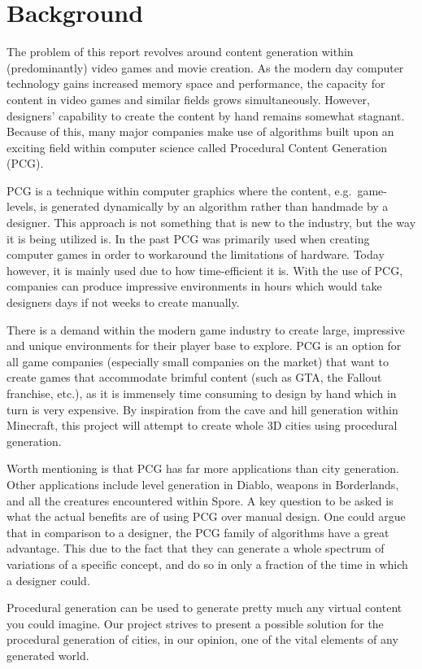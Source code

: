 \section{Background}
The problem of this report revolves around content generation within (predominantly) video games and movie creation. 
As the modern day computer technology gains increased memory space and performance, the capacity for content in video games and similar fields grows simultaneously. 
However, designers' capability to create the content by hand remains somewhat stagnant.
Because of this, many major companies make use of algorithms built upon an exciting field within computer science called Procedural Content Generation (PCG). 

PCG is a technique within computer graphics where the content, e.g.\ game-levels, is generated dynamically by an algorithm rather than handmade by a designer.
This approach is not something that is new to the industry, but the way it is being utilized is.
In the past PCG was primarily used when creating computer games  in order to workaround the limitations of hardware.
Today however, it is mainly used due to how time-efficient it is. 
With the use of PCG, companies can produce impressive environments in hours which would take designers days if not weeks to create manually.

There is a demand within the modern game industry to create large, impressive and unique environments for their player base to explore. 
PCG is an option for all game companies (especially small companies on the market) that want to create games that accommodate brimful content (such as GTA, the Fallout franchise, etc.), as it is immensely time consuming to design by hand which in turn is very expensive. 
By inspiration from the cave and hill generation within Minecraft, this project will attempt to create whole 3D cities using procedural generation. 

Worth mentioning is that PCG has far more applications than city generation.
Other applications include level generation in Diablo, weapons in Borderlands, and all the creatures encountered within Spore.
A key question to be asked is what the actual benefits are of using PCG over manual design. 
One could argue that in comparison to a designer, the PCG family of algorithms have a great advantage. This due to the fact that they can generate a whole spectrum of variations of a specific concept, and do so in only a fraction of the time in which a designer could. 

Procedural generation can be used to generate pretty much any virtual content you could imagine. 
Our project strives to present a possible solution for the procedural generation of cities, in our opinion, one of the vital elements of any generated world. 






